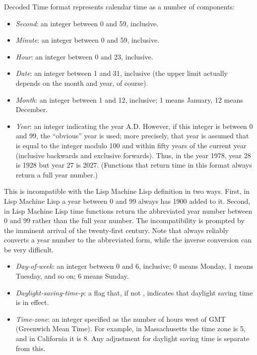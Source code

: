 Decoded Time format represents calendar time as a number of components:
\begin{itemize}
\item
{\it Second}: an integer between 0 and 59, inclusive.

\item
{\it Minute}: an integer between 0 and 59, inclusive.

\item
{\it Hour}: an integer between 0 and 23, inclusive.

\item
{\it Date}: an integer between 1 and 31, inclusive (the upper limit actually
depends on the month and year, of course).

\item
{\it Month}: an integer between 1 and 12, inclusive; 1 means January,
12 means December.

\item
{\it Year}: an integer indicating the year A.D.  However, if this integer
is between 0 and 99, the ``obvious'' year is used; more precisely,
that year is assumed that is equal to the integer modulo 100 and
within fifty years of the current year (inclusive backwards
and exclusive forwards).  Thus, in the year 1978, year 28 is 1928
but year 27 is 2027.  (Functions that return time in this format always return
a full year number.)
\end{itemize}

\beforenoterule
\begin{incompatibility}
This is incompatible with the Lisp Machine Lisp definition
in two ways.  First, in Lisp Machine Lisp a year between 0 and 99 always has 1900
added to it.  Second, in Lisp Machine Lisp time functions return the abbreviated
year number between 0 and 99 rather than the full year number.  The
incompatibility is prompted by the imminent arrival of the twenty-first
century.  Note that  always reliably converts a
year number to the abbreviated form, while the inverse conversion can be
very difficult.
\end{incompatibility}
\afternoterule

\begin{itemize}
\item
{\it Day-of-week}: an integer between 0 and 6, inclusive;
0 means Monday, 1 means Tuesday, and so on; 6 means Sunday.

\item
{\it Daylight-saving-time-p}: a flag that, if not {\false}, indicates that
daylight saving time is in effect.

\item
{\it Time-zone}: an integer specified as the number of hours west of GMT
(Greenwich Mean Time).  For example, in Massachusetts the time zone is 5,
and in California it is 8.  Any adjustment for daylight saving time is
separate from this.
\end{itemize}

